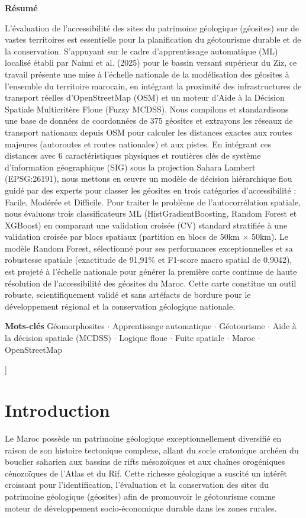 \documentclass[11pt,twocolumn,a4paper]{article}
\renewenvironment{abstract}{%
    \small\sffamily
    \noindent\textbf{Résumé}\quad
    \selectfont
}{%
    \vspace{0.4cm}
}
\begin{document}
\begin{@twocolumnfalse}
        \begin{abstract}
        L'évaluation de l'accessibilité des sites du patrimoine géologique (géosites) sur de vastes territoires est essentielle pour la planification du géotourisme durable et de la conservation. S'appuyant sur le cadre d'apprentissage automatique (ML) localisé établi par Naimi et al. (2025) pour le bassin versant supérieur du Ziz, ce travail présente une mise à l'échelle nationale de la modélisation des géosites à l'ensemble du territoire marocain, en intégrant la proximité des infrastructures de transport réelles d'OpenStreetMap (OSM) et un moteur d'Aide à la Décision Spatiale Multicritère Floue (Fuzzy MCDSS). Nous compilons et standardisons une base de données de coordonnées de 375 géosites et extrayons les réseaux de transport nationaux depuis OSM pour calculer les distances exactes aux routes majeures (autoroutes et routes nationales) et aux pistes. En intégrant ces distances avec 6 caractéristiques physiques et routières clés de système d'information géographique (SIG) sous la projection Sahara Lambert (EPSG:26191), nous mettons en œuvre un modèle de décision hiérarchique flou guidé par des experts pour classer les géosites en trois catégories d'accessibilité : Facile, Modérée et Difficile. Pour traiter le problème de l'autocorrélation spatiale, nous évaluons trois classificateurs ML (HistGradientBoosting, Random Forest et XGBoost) en comparant une validation croisée (CV) standard stratifiée à une validation croisée par blocs spatiaux (partition en blocs de 50km $\times$ 50km). Le modèle Random Forest, sélectionné pour ses performances exceptionnelles et sa robustesse spatiale (exactitude de 91,91\% et F1-score macro spatial de 0,9042), est projeté à l'échelle nationale pour générer la première carte continue de haute résolution de l'accessibilité des géosites du Maroc. Cette carte constitue un outil robuste, scientifiquement validé et sans artéfacts de bordure pour le développement régional et la conservation géologique nationale.
        \end{abstract}
        
        \noindent\textbf{Mots-clés} Géomorphosites $\cdot$ Apprentissage automatique $\cdot$ Géotourisme $\cdot$ Aide à la décision spatiale (MCDSS) $\cdot$ Logique floue $\cdot$ Fuite spatiale $\cdot$ Maroc $\cdot$ OpenStreetMap
        \vspace{0.8cm}
    \end{@twocolumnfalse}
]

\section{Introduction}
Le Maroc possède un patrimoine géologique exceptionnellement diversifié en raison de son histoire tectonique complexe, allant du socle cratonique archéen du bouclier saharien aux bassins de rifts mésozoïques et aux chaînes orogéniques cénozoïques de l'Atlas et du Rif. Cette richesse géologique a suscité un intérêt croissant pour l'identification, l'évaluation et la conservation des sites du patrimoine géologique (géosites) afin de promouvoir le géotourisme comme moteur de développement socio-économique durable dans les zones rurales.
\end{document}

